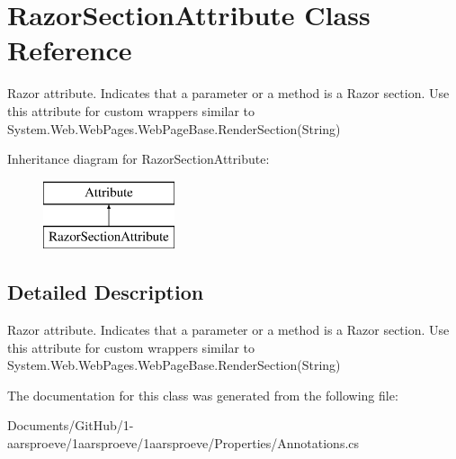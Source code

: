 \hypertarget{class_razor_section_attribute}{}\section{Razor\+Section\+Attribute Class Reference}
\label{class_razor_section_attribute}


Razor attribute. Indicates that a parameter or a method is a Razor section. Use this attribute for custom wrappers similar to {\ttfamily System.\+Web.\+Web\+Pages.\+Web\+Page\+Base.\+Render\+Section(\+String)}  


Inheritance diagram for Razor\+Section\+Attribute\+:\begin{figure}[H]
\begin{center}
\leavevmode
\includegraphics[height=2.000000cm]{class_razor_section_attribute}
\end{center}
\end{figure}


\subsection{Detailed Description}
Razor attribute. Indicates that a parameter or a method is a Razor section. Use this attribute for custom wrappers similar to {\ttfamily System.\+Web.\+Web\+Pages.\+Web\+Page\+Base.\+Render\+Section(\+String)} 



The documentation for this class was generated from the following file\+:\begin{DoxyCompactItemize}
\item 
Documents/\+Git\+Hub/1-\/aarsproeve/1aarsproeve/1aarsproeve/\+Properties/Annotations.\+cs\end{DoxyCompactItemize}
